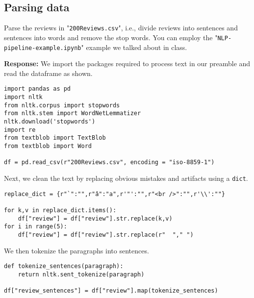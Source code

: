 \documentclass[12pt, letterpaper]{article}
\newcommand{\mybox}[1]{\par\noindent\colorbox{shadecolor}
{\parbox{\dimexpr\textwidth-2\fboxsep\relax}{#1}}}
\begin{document}
\subsection{Parsing data}
\mybox{Parse the reviews in "\texttt{200Reviews.csv}", i.e., divide reviews into sentences and sentences into words and remove the stop words. You can employ the "\texttt{NLP-pipeline-example.ipynb}" example we talked about in class.}

\textbf{Response:} We import the packages required to process text in our preamble and read the dataframe as shown.

\begin{mdframed}[backgroundcolor=shadecolor]
\begin{verbatim}
import pandas as pd
import nltk
from nltk.corpus import stopwords
from nltk.stem import WordNetLemmatizer
nltk.download('stopwords')
import re
from textblob import TextBlob
from textblob import Word

df = pd.read_csv(r"200Reviews.csv", encoding = "iso-8859-1")
\end{verbatim}
\end{mdframed}

Next, we clean the text by replacing obvious mistakes and artifacts using a \texttt{dict}.

\begin{mdframed}[backgroundcolor=shadecolor]
\begin{verbatim}
replace_dict = {r"`":"",r"â":"a",r'"':"",r"<br />":"",r'\\':""}

for k,v in replace_dict.items():
    df["review"] = df["review"].str.replace(k,v)
for i in range(5):
    df["review"] = df["review"].str.replace(r"  "," ")
\end{verbatim}
\end{mdframed}

We then tokenize the paragraphs into sentences.

\begin{mdframed}[backgroundcolor=shadecolor]
\begin{verbatim}
def tokenize_sentences(paragraph):
    return nltk.sent_tokenize(paragraph)

df["review_sentences"] = df["review"].map(tokenize_sentences)
\end{verbatim}
\end{mdframed}
\end{document}
